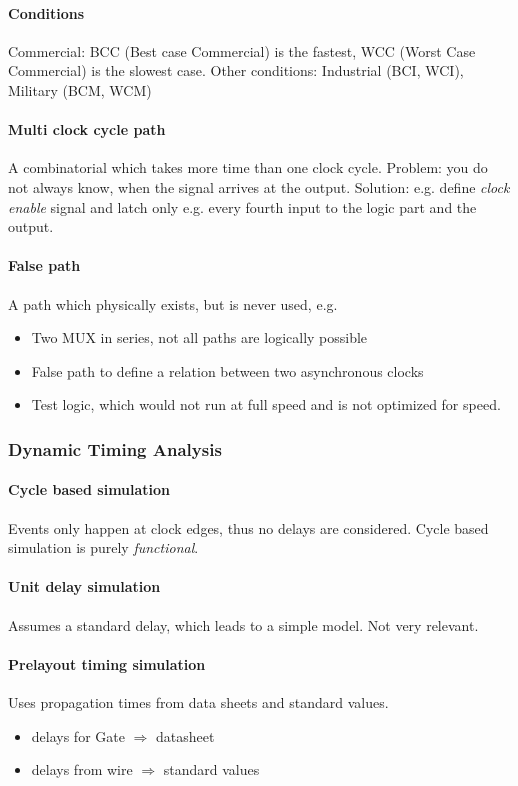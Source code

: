 \paragraph{Conditions}Commercial: BCC (Best case Commercial) is the fastest, WCC (Worst Case Commercial) is the slowest case. Other conditions: Industrial (BCI, WCI), Military (BCM, WCM) \\

\paragraph{Multi clock cycle path}A combinatorial which takes more time than one clock cycle. 
Problem: you do not always know, when the signal arrives at the output. 
Solution: e.g. define \emph{clock enable} signal and latch only e.g. every fourth input to the logic part and the output.

\paragraph{False path}A path which physically exists, but is never used, e.g.
\begin{itemize}
    \item Two MUX in series, not all paths are logically possible
    \item False path to define a relation between two asynchronous clocks
    \item Test logic, which would not run at full speed and is not optimized for speed.
\end{itemize}


\subsubsection{Dynamic Timing Analysis}
\paragraph{Cycle based simulation}
Events only happen at clock edges, thus no delays are considered.
Cycle based simulation is purely \emph{functional}.
\paragraph{Unit delay simulation}
Assumes a standard delay, which leads to a simple model. Not very relevant.
\paragraph{Prelayout timing simulation}
Uses propagation times from data sheets and standard values.
\begin{itemize}
	\item delays for Gate  $\Rightarrow$ datasheet
	\item delays from wire $\Rightarrow$ standard values
\end{itemize}
